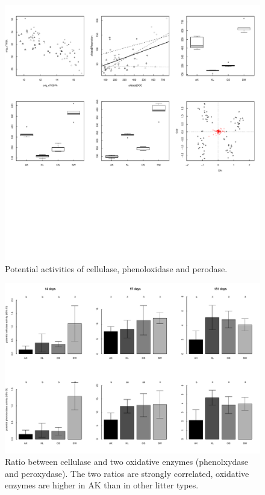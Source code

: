 \newpage
\begin{figure}[p]
\vspace*{2mm}
\begin{center}
\includegraphics[width=12cm]{enzymes_barplots.pdf}
\end{center}
\caption{Potential activities of cellulase, phenoloxidase and perodase.}
\end{figure}

\newpage
\begin{figure}[p]
\vspace*{2mm}
\begin{center}
\includegraphics[width=12cm]{enzyme_ratio_barplots.pdf}
\end{center}
\caption{Ratio between cellulase and two oxidative enzymes (phenolxydase and peroxydase). The two ratios are strongly correlated, oxidative enzymes are higher in AK than in other litter types.}
\end{figure}


